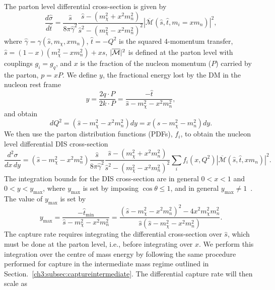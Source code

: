 The parton level differential cross-section is given by
\begin{equation}
    \frac{d\hat{\sigma}}{d\hat{t}} = \frac{\hat{s}}{8\pi\hat{\gamma}^2}\frac{\hat{s}-(m_\chi^2+x^2m_n^2)}{\hat{s}^2-(m_\chi^2-x^2m_n^2)^2}|\overline{\mathcal{M}}(\hat{s},\hat{t},m_i=x m_n)|^2,
\end{equation}
where $\hat{\gamma} = \gamma(\hat{s}, m_\chi, xm_n)$, $\hat{t}=-Q^2$ is the squared 4-momentum transfer,  $\hat{s} = (1-x)(m_\chi^2-x m_n^2) +xs$, $|\overline{\mathcal M}|^2$ is defined at the parton level with couplings $g_i=g_q$, and $x$ is the fraction of the nucleon momentum ($P$) carried by the parton, $p=xP$. We define $y$, the fractional energy lost by the DM in the nucleon rest frame~\cite{Agashe:2014yua_Directdetectionboosted}
\begin{equation}
    y = \frac{2q\cdot P}{2k\cdot P} = \frac{-\hat{t}}{\hat{s}-m_\chi^2-x^2m_n^2}, 
\end{equation}
and obtain
\begin{equation}
    dQ^2 = (\hat{s}-m_\chi^2 - x^2m_n^2)dy = x(s - m_\chi^2 - m_n^2)dy. 
\end{equation}
We then use the parton distribution functions (PDFs), $f_i$, to obtain the nucleon level differential DIS cross-section
\small
\begin{equation}
    \frac{d^2\sigma}{dx\, dy} =(\hat{s} - m_\chi^2-x^2m_n^2) \frac{\hat{s}}{8\pi\hat{\gamma}^2}\frac{\hat{s}-(m_\chi^2+x^2m_n^2)}{\hat{s}^2-(m_\chi^2-x^2m_n^2)^2}\sum_i f_i(x, Q^2)|\overline{\mathcal{M}}(\hat{s},\hat{t},x m_n)|^2.
\end{equation}
\normalsize
The integration bounds for the DIS cross-section are in general $0<x<1$ and $0<y<y_\mathrm{max}$, where $y_\mathrm{max}$ is set by imposing $\cos\theta\leq 1$, and in general $y_\mathrm{max}\neq 1$~\cite{Agashe:2014yua_Directdetectionboosted}. The value of $y_\mathrm{max}$ is set by
\begin{equation}
    y_\mathrm{max} = \frac{-\hat{t}_\mathrm{min}}{\hat{s} - m_\chi^2 - x^2 m_n^2}
     = \frac{(\hat{s} -m_\chi^2 -x^2m_n^2)^2 - 4 x^2 m_\chi^2 m_n^2}{\hat{s}(\hat{s} -m_\chi^2 - x^2m_n^2)}. 
\end{equation}
% 
The capture rate requires integrating the differential cross-section over $\hat{s}$, which must be done at the parton level, i.e., before integrating over $x$. We perform this integration over the centre of mass energy by following the same procedure performed for capture in the intermediate mass regime outlined in Section.~\ref{ch3:subsec:captureintermediate}. The differential capture rate will then scale as 

